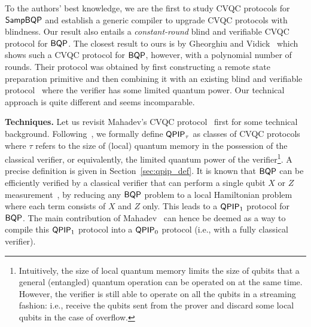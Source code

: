 To the authors' best knowledge, we are the first to study CVQC protocols for $\operatorname{\mathsf{SampBQP}}$ and establish a generic compiler to upgrade CVQC protocols with blindness.
Our result also entails a \emph{constant-round} blind and verifiable CVQC protocol for $\operatorname{\mathsf{BQP}}$.
The closest result to ours is by Gheorghiu and Vidick~\cite{FOCS:GheVid19} which shows such a CVQC protocol for $\operatorname{\mathsf{BQP}}$, however, with a polynomial number of rounds.
Their protocol was obtained by first constructing a remote state preparation primitive and then combining it with an existing blind and verifiable protocol~\cite{FK17} where the verifier has some limited quantum power.
Our technical approach is quite different and seems incomparable.

\vspace{2mm} \noindent \textbf{Techniques.} Let us revisit Mahadev's CVQC protocol~\cite{FOCS:Mahadev18a} first for some technical background. 
Following~\cite{FOCS:Mahadev18a}, we formally define $\operatorname{\mathsf{QPIP}}_{\tau}$ as classes of CVQC protocols where $\tau$ refers to the size of (local) quantum memory in the possession of the classical verifier, or equivalently, the limited quantum power of the verifier\footnote{Intuitively, the size of local quantum memory limits the size of qubits that a general (entangled) quantum operation can be operated on at the same time. However, the verifier is still able to operate on all the qubits in a streaming fashion: i.e., receive the qubits sent from the prover and discard some local qubits in the case of overflow.}. 
A precise definition is given in Section~\ref{sec:qpip_def}. 
It is known that $\operatorname{\mathsf{BQP}}$ can be efficiently verified by a classical verifier that can perform a single qubit $X$ or $Z$ measurement~\cite{PhysRevA.93.022326, mf16}, by reducing any $\operatorname{\mathsf{BQP}}$ problem to a local Hamiltonian problem where each term consists of  $X$ and $Z$ only. This leads to a $\operatorname{\mathsf{QPIP}}_1$ protocol for $\operatorname{\mathsf{BQP}}$.
The main contribution of Mahadev~\cite{FOCS:Mahadev18a} can hence be deemed as a way to compile this $\operatorname{\mathsf{QPIP}}_1$ protocol into a $\operatorname{\mathsf{QPIP}}_0$ protocol (i.e., with a fully classical verifier).

